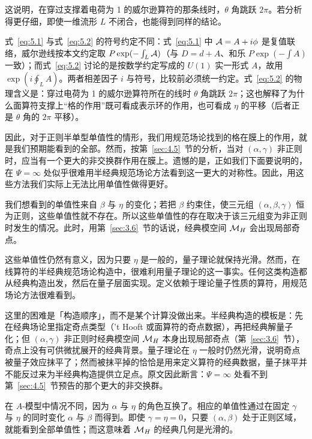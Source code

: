 这说明，在穿过支撑着电荷为 1 的威尔逊算符的那条线时，$\theta$ 角跳跃 $2\pi$。若分析得更仔细，即使一维流形 $L$ 不闭合，也能得到同样的结论。

\begin{yizhu}[易错点]
式~\eqref{eq:5.1} 与式~\eqref{eq:5.2} 的符号约定不同：式~\eqref{eq:5.1} 中 ${\mathcal A}=A+i\phi$ 是复值联络，威尔逊线按本文约定取 $P\exp(-\int_L{\mathcal A})$（与 $D=d+A$、和乐 $P\exp(-\int A)$ 一致）；而式~\eqref{eq:5.2} 讨论的是按数学约定写成的 $U(1)$ 实一形式 $A$，故用 $\exp(i\oint_LA)$。两者相差因子 $i$ 与符号，比较前必须统一约定。式~\eqref{eq:5.2} 的物理含义是：穿过电荷为 1 的威尔逊算符所在的线时 $\theta$ 角跳跃 $2\pi$；这也解释了为什么面算符支撑上“格的作用”既可看成表示环的作用，也可看成 $\eta$ 的平移（后者正是 $\theta$ 角的 $2\pi$ 平移）。
\end{yizhu}

\bigskip{}

因此，对于正则半单型单值性的情形，我们用规范场论找到的格在膜上的作用，就是我们预期能看到的全部。然而，按第~\ref{sec:4.5}~节的分析，当对 $(\alpha,\gamma)$ 非正则时，应当有一个更大的非交换群作用在膜上。遗憾的是，正如我们下面要说明的，在 $\Psi=\infty$ 处似乎很难用半经典规范场论方法看到这一更大的对称性。因此，用这些方法我们实际上无法比用单值性做得更好。

我们想看到的单值性来自 $\beta$ 与 $\eta$ 的变化；若把 $\beta$ 约束住，使三元组 $(\alpha,\beta,\gamma)$ 恒为正则，这些单值性就不存在。所以这些单值性的存在取决于该三元组变为非正则时发生的情况。此时，用第~\ref{sec:3.6}~节的话说，经典模空间 ${{\mathcal{M}}_H}$ 会出现局部奇点。

这些单值性仍然有意义，因为只要 $\eta$ 是一般的，量子理论就保持光滑。然而，在线算符的半经典规范场论构造中，很难利用量子理论的这一事实。任何这类构造都从经典构造出发，然后在量子层面实现。定义依赖于理论量子性质的算符，用规范场论方法很难看到。

\begin{yizhu}[含糊点拨]
这里的困难是「构造顺序」，而不是某个计算没做出来。半经典构造的模板是：先在经典场论里指定奇点类型（'t Hooft 或面算符的奇点数据），再把经典解量子化；但 $(\alpha,\gamma)$ 非正则时经典模空间 ${{\mathcal{M}}_H}$ 本身出现局部奇点（第~\ref{sec:3.6}~节），奇点上没有可供微扰展开的经典背景。量子理论在 $\eta$ 一般时仍然光滑，说明奇点被量子效应抹平了；然而被抹平掉的恰恰是用来定义算符的经典数据，量子抹平并不能反过来为半经典构造提供立足点。原文因此断言：$\Psi=\infty$ 处看不到第~\ref{sec:4.5}~节预告的那个更大的非交换群。
\end{yizhu}

在 $A$-模型中情况不同，因为 $\alpha$ 与 $\eta$ 的角色互换了。相应的单值性通过在固定 $\gamma$ 与 $\eta$ 的同时变化 $\alpha$ 与 $\beta$ 而得到。即使 $\gamma=\eta=0$，只要 $(\alpha,\beta)$ 处于正则区域，就能看到全部单值性；而这意味着 ${{\mathcal{M}}_H}$ 的经典几何是光滑的。

